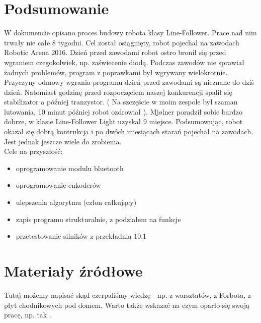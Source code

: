 \documentclass[12pt,a4paper]{article}
\begin{document}
\section{Podsumowanie}
W dokumencie opisano proces budowy robota klasy Line-Follower. Prace nad nim trwały nie całe 8 tygodni. Cel został osiągnięty, robot pojechał na zawodach Robotic Arena 2016. Dzień przed zawodami robot ostro bronił się przed wgraniem czegokolwiek, np. zaświecenie diodą. Podczas zawodów nie sprawiał żadnych problemów, program z poprawkami był wgrywany wielokrotnie. Przyczyny odmowy wgrania programu dzień przed zawodami są nieznane do dziś dzień. Natomiast godzinę przed rozpoczęciem naszej konkurencji spalił się stabilizator a później tranzystor. ( Na szczęście w moim zespole był szaman lutowania, 10 minut później robot ozdrowiał ). Mjølner poradził sobie bardzo dobrze, w klasie Line-Follower Light uzyskał 9 miejsce. Podsumowując, robot okazał się dobrą kontrukcja i po dwóch miesiącach starań pojechał na zawodach. Jest jednak jeszcze wiele do zrobienia.
\\
\newline Cele na przyszłość:
\begin{itemize}
\item oprogramowanie modulu bluetooth
\item oprogramowanie enkoderów
\item ulepszenia algorytmu (człon całkujący)
\item zapis programu strukturalnie, z podziałem na funkcje
\item przetestowanie silników z przekładnią 10:1
\end{itemize}


\section{Materiały źródłowe}
Tutaj możemy napisać skąd czerpaliśmy wiedzę - np. z warsztatów, z Forbota, z płyt chodnikowych pod domem.
Warto także wskazać na czym oparło się swoją pracę, np. tak \cite{buka}.



\clearpage
\end{document}
